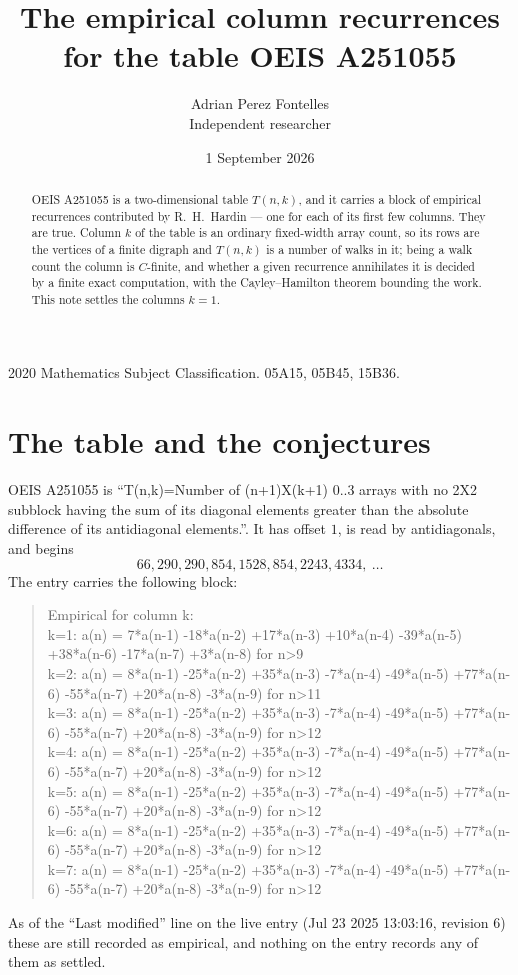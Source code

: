 \documentclass[11pt,a4paper]{article}
\title{The empirical column recurrences for the table OEIS A251055}
\author{Adrian Perez Fontelles\\ \small Independent researcher}
\date{1 September 2026}
\theoremstyle{plain}
\theoremstyle{definition}
\begin{document}
\maketitle

\begin{abstract}
OEIS A251055 is a two-dimensional table $T(n,k)$, and it carries a block of empirical
recurrences contributed by R.~H.~Hardin --- one for each of its first few columns. They are
true. Column $k$ of the table is an ordinary fixed-width array count, so its rows are the
vertices of a finite digraph and $T(n,k)$ is a number of walks in it; being a walk count the
column is $C$-finite, and whether a given recurrence annihilates it is decided by a finite
exact computation, with the Cayley--Hamilton theorem bounding the work. This note settles the
columns $k=1$.
\end{abstract}

\noindent\small 2020 Mathematics Subject Classification. 05A15, 05B45, 15B36.\normalsize

\section{The table and the conjectures}

OEIS A251055 is ``T(n,k)=Number of (n+1)X(k+1) 0..3 arrays with no 2X2 subblock having the sum of its diagonal elements greater than the absolute difference of its antidiagonal elements.''. It has offset $1$, is
read by antidiagonals, and begins
\[
66, 290, 290, 854, 1528, 854, 2243, 4334,\ \dots
\]
The entry carries the following block:
\begin{quote}\small
Empirical for column k:\\
k=1: a(n) = 7*a(n-1) -18*a(n-2) +17*a(n-3) +10*a(n-4) -39*a(n-5) +38*a(n-6) -17*a(n-7) +3*a(n-8) for n>9\\
k=2: a(n) = 8*a(n-1) -25*a(n-2) +35*a(n-3) -7*a(n-4) -49*a(n-5) +77*a(n-6) -55*a(n-7) +20*a(n-8) -3*a(n-9) for n>11\\
k=3: a(n) = 8*a(n-1) -25*a(n-2) +35*a(n-3) -7*a(n-4) -49*a(n-5) +77*a(n-6) -55*a(n-7) +20*a(n-8) -3*a(n-9) for n>12\\
k=4: a(n) = 8*a(n-1) -25*a(n-2) +35*a(n-3) -7*a(n-4) -49*a(n-5) +77*a(n-6) -55*a(n-7) +20*a(n-8) -3*a(n-9) for n>12\\
k=5: a(n) = 8*a(n-1) -25*a(n-2) +35*a(n-3) -7*a(n-4) -49*a(n-5) +77*a(n-6) -55*a(n-7) +20*a(n-8) -3*a(n-9) for n>12\\
k=6: a(n) = 8*a(n-1) -25*a(n-2) +35*a(n-3) -7*a(n-4) -49*a(n-5) +77*a(n-6) -55*a(n-7) +20*a(n-8) -3*a(n-9) for n>12\\
k=7: a(n) = 8*a(n-1) -25*a(n-2) +35*a(n-3) -7*a(n-4) -49*a(n-5) +77*a(n-6) -55*a(n-7) +20*a(n-8) -3*a(n-9) for n>12\\
\end{quote}
As of the ``Last modified'' line on the live entry (Jul 23 2025 13:03:16, revision 6) these are still
recorded as empirical, and nothing on the entry records any of them as settled.
\end{document}

